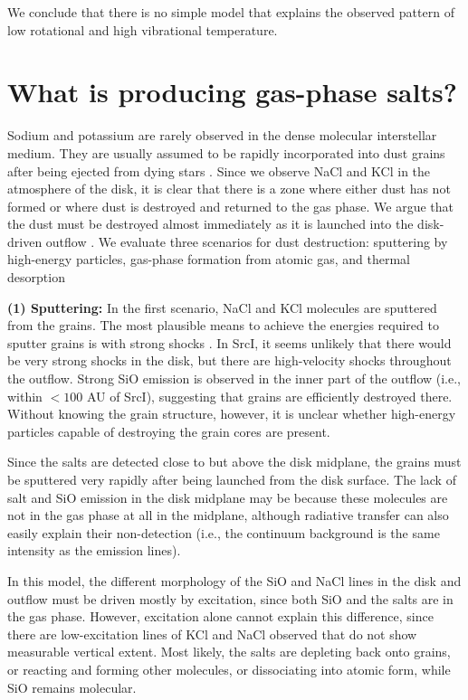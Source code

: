 \documentclass[12pt]{article}
\newcommand{\sourcei}{SrcI\xspace}
\begin{document}
We conclude that there is no simple model that explains the observed pattern of
low rotational and high vibrational temperature.



\section{What is producing gas-phase salts?}

Sodium and potassium are rarely observed in the dense molecular interstellar
medium.  They are usually assumed to be rapidly incorporated into dust grains
after being ejected from dying stars \cite{Milam2007a}.  Since we
observe NaCl and KCl in the atmosphere of the disk, it is clear that
there is a zone where either dust has not  formed or
where dust is destroyed and returned to the gas phase.  We argue that the dust
must be destroyed almost immediately as it is launched into the disk-driven
outflow \cite{Hirota2017a}. We evaluate three scenarios for dust destruction:
sputtering by high-energy particles, gas-phase formation from atomic gas, and
thermal desorption


\textbf{(1) Sputtering:}
In the first scenario, NaCl and KCl molecules are sputtered from the grains.
The most plausible means to achieve the energies required to sputter grains is
with strong shocks \cite{Schilke1997a,Decin2016a}.  In \sourcei, it seems
unlikely that there would be very strong shocks in the disk, but there are
high-velocity shocks throughout the outflow. Strong SiO emission is observed in
the inner part of the outflow (i.e., within $<100$ AU of \sourcei), suggesting
that grains are efficiently destroyed there.  Without knowing the grain
structure, however, it is unclear whether high-energy particles capable of
destroying the grain cores are present.

Since the salts are detected close to but above the disk midplane, the
grains must be sputtered very rapidly after being launched from the disk surface.
The lack of salt and SiO emission in the disk midplane may be because these
molecules are not in the gas phase at all in the midplane, although radiative
transfer can also easily explain their non-detection (i.e., the continuum
background is the same intensity as the emission lines).

In this model, the different morphology of the SiO and NaCl lines in the disk
and outflow must be driven mostly by excitation, since both SiO and the salts are
in the gas phase.  However, excitation alone cannot explain this difference,
since there are low-excitation lines of KCl and NaCl observed that do not
show measurable vertical extent.  Most likely, the salts are depleting back onto
grains, or reacting and forming other molecules, or dissociating into 
atomic form, while SiO remains molecular.
\end{document}
